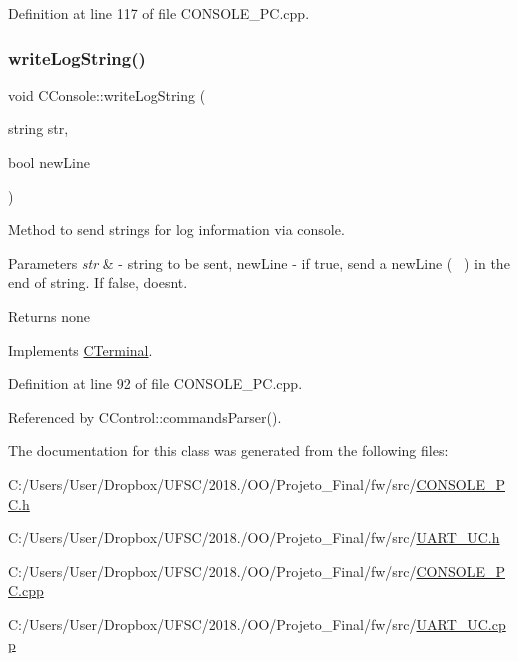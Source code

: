 Definition at line 117 of file C\+O\+N\+S\+O\+L\+E\+\_\+\+P\+C.\+cpp.

\mbox{\label{class_c_console_a23af1eebefd7cce94b4bdd5cc430e360}} 
\subsubsection{\texorpdfstring{write\+Log\+String()}{writeLogString()}}
{\footnotesize\ttfamily void C\+Console\+::write\+Log\+String (\begin{DoxyParamCaption}\item[{string}]{str,  }\item[{bool}]{new\+Line }\end{DoxyParamCaption})\hspace{0.3cm}{\ttfamily [virtual]}}



Method to send strings for log information via console. 


\begin{DoxyParams}{Parameters}
{\em str} & -\/ string to be sent, new\+Line -\/ if true, send a new\+Line (~\newline
) in the end of string. If false, doesn\textquotesingle{}t. \\
\hline
\end{DoxyParams}
\begin{DoxyReturn}{Returns}
none 
\end{DoxyReturn}


Implements \mbox{\hyperlink{class_c_terminal}{C\+Terminal}}.



Definition at line 92 of file C\+O\+N\+S\+O\+L\+E\+\_\+\+P\+C.\+cpp.



Referenced by C\+Control\+::commands\+Parser().



The documentation for this class was generated from the following files\+:\begin{DoxyCompactItemize}
\item 
C\+:/\+Users/\+User/\+Dropbox/\+U\+F\+S\+C/2018./\+O\+O/\+Projeto\+\_\+\+Final/fw/src/\mbox{\hyperlink{_c_o_n_s_o_l_e___p_c_8h}{C\+O\+N\+S\+O\+L\+E\+\_\+\+P\+C.\+h}}\item 
C\+:/\+Users/\+User/\+Dropbox/\+U\+F\+S\+C/2018./\+O\+O/\+Projeto\+\_\+\+Final/fw/src/\mbox{\hyperlink{_u_a_r_t___u_c_8h}{U\+A\+R\+T\+\_\+\+U\+C.\+h}}\item 
C\+:/\+Users/\+User/\+Dropbox/\+U\+F\+S\+C/2018./\+O\+O/\+Projeto\+\_\+\+Final/fw/src/\mbox{\hyperlink{_c_o_n_s_o_l_e___p_c_8cpp}{C\+O\+N\+S\+O\+L\+E\+\_\+\+P\+C.\+cpp}}\item 
C\+:/\+Users/\+User/\+Dropbox/\+U\+F\+S\+C/2018./\+O\+O/\+Projeto\+\_\+\+Final/fw/src/\mbox{\hyperlink{_u_a_r_t___u_c_8cpp}{U\+A\+R\+T\+\_\+\+U\+C.\+cpp}}\end{DoxyCompactItemize}
